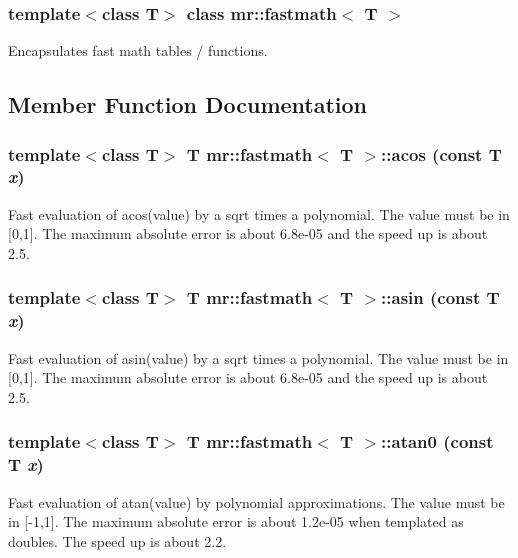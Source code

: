 \subsubsection*{template$<$class T$>$ class mr::fastmath$<$ T $>$}

Encapsulates fast math tables / functions. 



\subsection{Member Function Documentation}
\subsubsection{\setlength{\rightskip}{0pt plus 5cm}template$<$class T$>$ T {\bf mr::fastmath}$<$ T $>$::acos (const T {\em x})\hspace{0.3cm}{\tt  [inline, static]}}\label{classmr_1_1fastmath_e7}


Fast evaluation of acos(value) by a sqrt times a polynomial. The value must be in [0,1]. The maximum absolute error is about 6.8e-05 and the speed up is about 2.5. 
\subsubsection{\setlength{\rightskip}{0pt plus 5cm}template$<$class T$>$ T {\bf mr::fastmath}$<$ T $>$::asin (const T {\em x})\hspace{0.3cm}{\tt  [inline, static]}}\label{classmr_1_1fastmath_e6}


Fast evaluation of asin(value) by a sqrt times a polynomial. The value must be in [0,1]. The maximum absolute error is about 6.8e-05 and the speed up is about 2.5. 
\subsubsection{\setlength{\rightskip}{0pt plus 5cm}template$<$class T$>$ T {\bf mr::fastmath}$<$ T $>$::atan0 (const T {\em x})\hspace{0.3cm}{\tt  [inline, static]}}\label{classmr_1_1fastmath_e8}


Fast evaluation of atan(value) by polynomial approximations. The value must be in [-1,1]. The maximum absolute error is about 1.2e-05 when templated as doubles. The speed up is about 2.2. 
